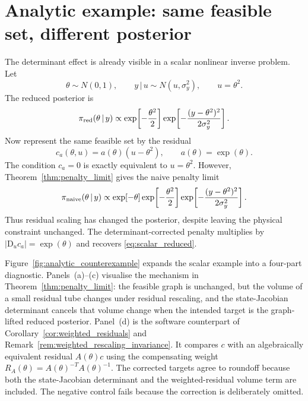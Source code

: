 \documentclass[11pt]{article}
\newcommand{\D}{\mathrm{D}}
\newcommand{\abs}[1]{\left\lvert #1\right\rvert}
\newcommand{\given}{\,|\,}
\begin{document}
\section{Analytic example: same feasible set, different posterior}
\label{sec:analytic_example}

The determinant effect is already visible in a scalar nonlinear inverse problem. Let
\begin{equation}
 \theta\sim N(0,1),
 \qquad
 y\given u\sim N(u,\sigma_y^2),
 \qquad
 u=\theta^2.
\end{equation}
The reduced posterior is
\begin{equation}
 \pi_{\rm red}(\theta\given y)
 \propto
 \exp\!\left[-\frac{\theta^2}{2}\right]
 \exp\!\left[-\frac{(y-\theta^2)^2}{2\sigma_y^2}\right].
 \label{eq:scalar_reduced}
\end{equation}
Now represent the same feasible set by the residual
\begin{equation}
 c_a(\theta,u)=a(\theta)(u-\theta^2),
 \qquad
 a(\theta)=\exp(\theta).
 \label{eq:scalar_residual}
\end{equation}
The condition \(c_a=0\) is exactly equivalent to \(u=\theta^2\). However, Theorem~\ref{thm:penalty_limit} gives the naive penalty limit
\begin{equation}
 \pi_{\rm naive}(\theta\given y)
 \propto
 \exp\!\left[-\theta\right]
 \exp\!\left[-\frac{\theta^2}{2}\right]
 \exp\!\left[-\frac{(y-\theta^2)^2}{2\sigma_y^2}\right].
 \label{eq:scalar_naive}
\end{equation}
Thus residual scaling has changed the posterior, despite leaving the physical constraint unchanged. The determinant-corrected penalty multiplies by \(\abs{\D_u c_a}=\exp(\theta)\) and recovers \eqref{eq:scalar_reduced}.

Figure~\ref{fig:analytic_counterexample} expands the scalar example into a four-part diagnostic. Panels~(a)--(c) visualise the mechanism in Theorem~\ref{thm:penalty_limit}: the feasible graph is unchanged, but the volume of a small residual tube changes under residual rescaling, and the state-Jacobian determinant cancels that volume change when the intended target is the graph-lifted reduced posterior. Panel~(d) is the software counterpart of Corollary~\ref{cor:weighted_residuals} and Remark~\ref{rem:weighted_rescaling_invariance}. It compares \(c\) with an algebraically equivalent residual \(A(\theta)c\) using the compensating weight \(R_A(\theta)=A(\theta)^{-T}A(\theta)^{-1}\). The corrected targets agree to roundoff because both the state-Jacobian determinant and the weighted-residual volume term are included. The negative control fails because the correction is deliberately omitted.
\end{document}
